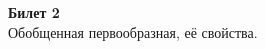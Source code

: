\documentclass[a4paper]{report}
\begin{document}
\setlength{\parskip}{6pt}

\noindent
\begin{center}
    \textbf{Билет 2}\\
    Обобщенная первообразная, её свойства.\\
\end{center}
\end{document}
